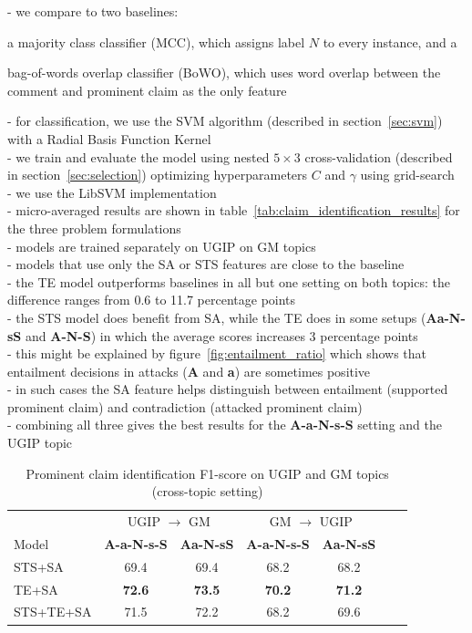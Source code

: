 - we compare to two baselines: \begin{enumerate*}
\item a majority class classifier (MCC), which assigns label $N$ to every instance, and a 
\item bag-of-words overlap classifier (BoWO), which uses word overlap between the comment and prominent claim as the only feature 
\end{enumerate*}
- for classification, we use the SVM algorithm (described in section~\ref{sec:svm}) with a 
Radial Basis Function Kernel \\
- we train and evaluate the model using nested $5 \times 3$ cross-validation
(described in section~\ref{sec:selection}) optimizing hyperparameters $C$ and $\gamma$ using
grid-search \\
- we use the LibSVM implementation \citep{chang2011libsvm} \\
- micro-averaged results are shown in table~\ref{tab:claim_identification_results}
for the three problem formulations \\
- models are trained separately on UGIP on GM topics \\
- models that use only the SA or STS features are close to the baseline \\
- the TE model outperforms baselines in all but one setting on both topics: 
the difference ranges from 0.6 to 11.7 percentage points \\
- the STS model does benefit from SA, while the TE does in some setups 
(\textbf{Aa-N-sS} and \textbf{A-N-S}) in which the average scores increases 3 percentage points \\
- this might be explained by figure~\ref{fig:entailment_ratio} which shows that 
entailment decisions in attacks (\textbf{A} and \textbf{a}) are sometimes positive \\
- in such cases the SA feature helps distinguish between entailment (supported prominent claim) 
and contradiction (attacked prominent claim) \\
- combining all three gives the best results for the \textbf{A-a-N-s-S} setting and the UGIP topic \\

\begin{table}
\centering
{\small
\begin{tabular}{@{}l ccc ccc@{}}
\toprule
& \multicolumn{2}{c}{UGIP $\to$ GM} & \multicolumn{2}{c}{GM $\to$ UGIP}\\
\cmidrule(lr){2-3}\cmidrule(lr){4-5}
Model & \textbf{A-a-N-s-S} & \textbf{Aa-N-sS}
      & \textbf{A-a-N-s-S} & \textbf{Aa-N-sS} \\
\midrule
STS+SA & 69.4 & 69.4 & 68.2 & 68.2   \\
TE+SA & \textbf{72.6 }& \textbf{73.5} & \textbf{70.2} & \textbf{71.2}  \\
STS+TE+SA  & 71.5 & 72.2 & 68.2 & 69.6  \\
\bottomrule
\end{tabular}}
\caption{Prominent claim identification F1-score on UGIP and GM topics (cross-topic
setting)}
\label{tab:claim_identification_crosstopic}
\end{table}

